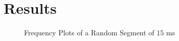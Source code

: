\chapter{Results} %
\label{cha:results}
\begin{figure}[htbp]
	\begin{center}
	\caption{Frequency Plots of a Random Segment of $15$ ms}
	\label{fig:frequency_plots_of_converted_signal}
	\end{center}
\end{figure}


